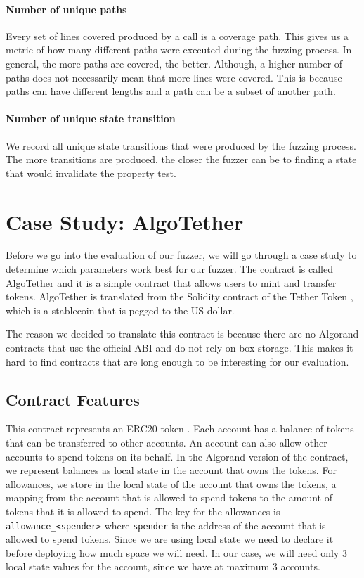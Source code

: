 \paragraph{Number of unique paths} Every set of lines covered produced by a call is a coverage path.
This gives us a metric of how many different paths were executed during the fuzzing process.
In general, the more paths are covered, the better.
Although, a higher number of paths does not necessarily mean that more lines were covered.
This is because paths can have different lengths and a path can be a subset of another path.

\paragraph{Number of unique state transition} We record all unique state transitions that were produced by the fuzzing process.
The more transitions are produced, the closer the fuzzer can be to finding a state that would invalidate the property test.

\section{Case Study: AlgoTether} \label{section:case-study}
Before we go into the evaluation of our fuzzer, we will go through a case study to determine which parameters work best for our fuzzer.
The contract is called AlgoTether and it is a simple contract that allows users to mint and transfer tokens.
AlgoTether is translated from the Solidity contract of the Tether Token \cite{etherscanio_tether_nodate}, which is a stablecoin that is pegged to the US dollar.

The reason we decided to translate this contract is because there are no Algorand contracts that use the official \ac{ABI} and do not rely on box storage.
This makes it hard to find contracts that are long enough to be interesting for our evaluation.

\subsection*{Contract Features}
This contract represents an ERC20 token \cite{noauthor_erc-20_nodate}.
Each account has a balance of tokens that can be transferred to other accounts.
An account can also allow other accounts to spend tokens on its behalf.
In the Algorand version of the contract, we represent balances as local state in the account that owns the tokens.
For allowances, we store in the local state of the account that owns the tokens, a mapping from the account that is allowed to spend tokens to the amount of tokens that it is allowed to spend.
The key for the allowances is \texttt{allowance\_<spender>} where \texttt{spender} is the address of the account that is allowed to spend tokens.
Since we are using local state we need to declare it before deploying how much space we will need.
In our case, we will need only 3 local state values for the account, since we have at maximum 3 accounts.

